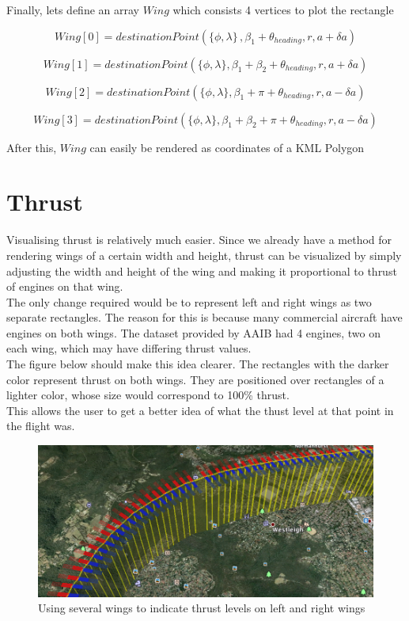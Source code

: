 Finally, lets define an array $Wing$ which consists 4 vertices to plot the rectangle

\begin{equation}
Wing[0] = destinationPoint(\{\phi, \lambda\}\, , \beta_{1} + \theta_{heading}, r, a + \delta a)
\end{equation}

\begin{equation}
Wing[1] = destinationPoint(\{\phi, \lambda\}, \beta_{1} + \beta_{2} +  \theta_{heading},r, a + \delta a )
\end{equation}

\begin{equation}
Wing[2] = destinationPoint(\{\phi, \lambda\}, \beta_{1} + \pi + \theta_{heading},r, a - \delta a )
\end{equation}

\begin{equation}
Wing[3] = destinationPoint(\{\phi, \lambda\}, \beta_{1} + \beta_{2} + \pi + \theta_{heading},r, a - \delta a)
\end{equation}

After this, $Wing$ can easily be rendered as coordinates of a KML Polygon


\section{Thrust}

Visualising thrust is relatively much easier. Since we already have a method for rendering wings of a certain width and height, thrust can be visualized by simply adjusting the width and height of the wing and making it proportional to thrust of engines on that wing.\\

The only change required would be to represent left and right wings as two separate rectangles. The reason for this is because many commercial aircraft have engines on both wings. The dataset provided by AAIB had 4 engines, two on each wing, which may have differing thrust values. \\

The figure below should make this idea clearer. The rectangles with the darker color represent thrust on both wings. They are positioned over rectangles of a lighter color, whose size would correspond to 100\% thrust. \\

This allows the user to get a better idea of what the thust level at that point in the flight was.

\begin{figure}[h]
\caption{Using several wings to indicate thrust levels on left and right wings}
\includegraphics[scale=0.4]{gfx/thrust-sample.png}
\end{figure}
